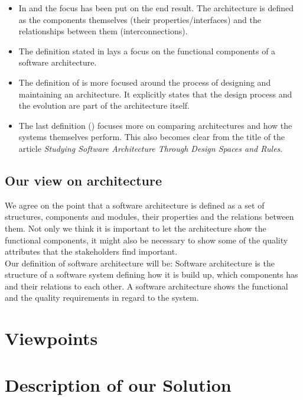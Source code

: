 \documentclass{article}
\begin{document}
\begin{itemize}
\item In \cite{clemens} and \cite{hayesroth} the focus has been put on the end result. The architecture is defined as the components themselves (their properties/interfaces) and the relationships between them (interconnections).
\item The definition stated in \cite{hayesroth} lays a focus on the functional components of a software architecture.
\item The definition of \cite{IEEE1471} is more focused around the process of
designing and maintaining an architecture. It explicitly states that the design
process and the evolution are part of the architecture itself.
\item The last definition (\cite{lane90}) focuses more on comparing
architectures and how the systems themselves perform. This also becomes clear
from the title of the article \emph{Studying Software Architecture Through
Design Spaces and Rules}.

\end{itemize}

\subsection{Our view on architecture}

We agree on the point that a software architecture is defined as a set of
structures, components and modules, their properties and the relations
between them. 
Not only we think it is important to let the architecture show the functional components, it might also be necessary to show some of the quality attributes that the stakeholders find important. \\ 

Our definition of software architecture will be:
Software architecture is the structure of a software system defining how it is
build up, which components has and their relations to each other. 
A software architecture shows the functional and the quality requirements in
regard to the system.

\section{Viewpoints}


\section{Description of our Solution}
\end{document}
